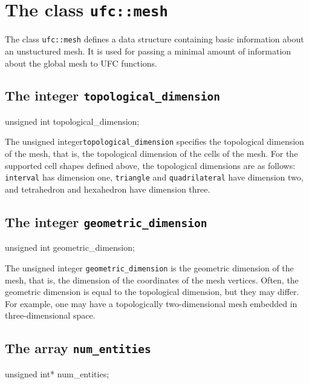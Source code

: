 \section{The class \texttt{ufc::mesh}}

The class \texttt{ufc::mesh} defines a data structure containing basic
information about an unstuctured mesh. It is used for passing a
minimal amount of information about the global mesh to UFC
functions.

\subsection{The integer \texttt{topological\_dimension}}

\begin{code}
unsigned int topological_dimension;
\end{code}

The unsigned integer\texttt{topological\_dimension}
specifies the topological dimension of the mesh, that is, the
topological dimension of the cells of the mesh. For the supported
cell shapes defined above, the topological dimensions are as follows:
\texttt{interval} has dimension one, \texttt{triangle} and
\texttt{quadri\-lateral} have dimension two, and tetrahedron and
hexahedron have dimension three.

\subsection{The integer \texttt{geometric\_dimension}}

\begin{code}
unsigned int geometric_dimension;
\end{code}

The unsigned integer \texttt{geometric\_dimension} is the geometric dimension
of the mesh, that is, the dimension of the coordinates of the mesh vertices.
Often, the geometric dimension is equal to the topological dimension,
but they may differ. For example, one may have a topologically
two-dimensional mesh embedded in three-dimensional space.

\subsection{The array \texttt{num\_entities}}

\begin{code}
unsigned int* num_entities;
\end{code}

